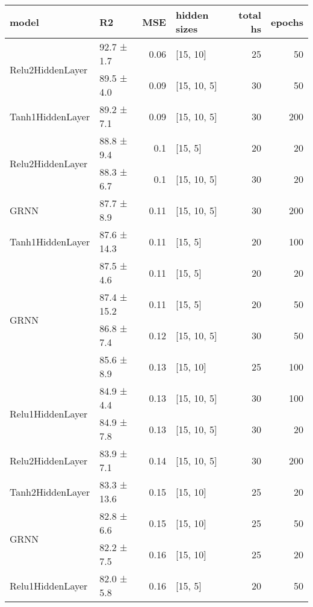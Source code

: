 
    \begin{table*}[h]
        \centering
        \begin{tabular}{llrlrr}
\hline
 model   & R2          &   MSE & hidden sizes   &   total hs &   epochs \\
\hline
 \hline
\multirow{2}{*}{Relu2HiddenLayer}         & 92.7 ± 1.7  &  0.06 & [15, 10]       &         25 &       50 \\
         & 89.5 ± 4.0  &  0.09 & [15, 10, 5]    &         30 &       50 \\
 \hline
Tanh1HiddenLayer         & 89.2 ± 7.1  &  0.09 & [15, 10, 5]    &         30 &      200 \\
 \hline
\multirow{2}{*}{Relu2HiddenLayer}         & 88.8 ± 9.4  &  0.1  & [15, 5]        &         20 &       20 \\
         & 88.3 ± 6.7  &  0.1  & [15, 10, 5]    &         30 &       20 \\
 \hline
GRNN         & 87.7 ± 8.9  &  0.11 & [15, 10, 5]    &         30 &      200 \\
 \hline
Tanh1HiddenLayer         & 87.6 ± 14.3 &  0.11 & [15, 5]        &         20 &      100 \\
 \hline
\multirow{4}{*}{GRNN}         & 87.5 ± 4.6  &  0.11 & [15, 5]        &         20 &       20 \\
         & 87.4 ± 15.2 &  0.11 & [15, 5]        &         20 &       50 \\
         & 86.8 ± 7.4  &  0.12 & [15, 10, 5]    &         30 &       50 \\
         & 85.6 ± 8.9  &  0.13 & [15, 10]       &         25 &      100 \\
 \hline
\multirow{2}{*}{Relu1HiddenLayer}         & 84.9 ± 4.4  &  0.13 & [15, 10, 5]    &         30 &      100 \\
         & 84.9 ± 7.8  &  0.13 & [15, 10, 5]    &         30 &       20 \\
 \hline
Relu2HiddenLayer         & 83.9 ± 7.1  &  0.14 & [15, 10, 5]    &         30 &      200 \\
 \hline
Tanh2HiddenLayer         & 83.3 ± 13.6 &  0.15 & [15, 10]       &         25 &       20 \\
 \hline
\multirow{2}{*}{GRNN}         & 82.8 ± 6.6  &  0.15 & [15, 10]       &         25 &       50 \\
         & 82.2 ± 7.5  &  0.16 & [15, 10]       &         25 &       20 \\
 \hline
Relu1HiddenLayer         & 82.0 ± 5.8  &  0.16 & [15, 5]        &         20 &       50 \\

\end{tabular}
\end{table*}
